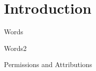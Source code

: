 \documentclass[oneside,12pt,final]{ucthesis-CA2012}
\begin{document}
\begin{frontmatter}
	
	\maketitle
	\approvalpage
	\copyrightpage
	
	
	
	\tableofcontents
\end{frontmatter}

\begin{mainmatter}

\pagestyle{fancy}
\renewcommand{\chaptermark}[1]{\markboth{{\sf #1 \hspace*{\fill} Chapter~\thechapter}}{} }
\renewcommand{\sectionmark}[1]{\markright{ {\sf Section~\thesection \hspace*{\fill} #1 }}}
\fancyhf{}

\makeatletter \if@twoside \fancyhead[LO]{\small \rightmark} \fancyhead[RE]{\small\leftmark} \else \fancyhead[LO]{\small\leftmark}
\fancyhead[RE]{\small\rightmark} \fi

\def\cleardoublepage{\clearpage\if@openright \ifodd\c@page\else
  \hbox{}
  \vspace*{\fill}
  \begin{center}
    This page intentionally left blank
  \end{center}
  \vspace{\fill}
  \thispagestyle{plain}
  \newpage
  \fi \fi}
\makeatother
\fancyfoot[c]{\textrm{\textup{\thepage}}} %
\fancyfoot[C]{\thepage}
\renewcommand{\headrulewidth}{0.4pt}

 { \fancyhf{} \fancyfoot[C]{\thepage}
\renewcommand{\headrulewidth}{0pt}
\renewcommand{\footrulewidth}{0pt}}

\chapter{Introduction}

Words

Words2

\begin{section}{Permissions and Attributions}
\begin{enumerate}


\end{enumerate}
\end{section}
\end{mainmatter}
\end{document}
